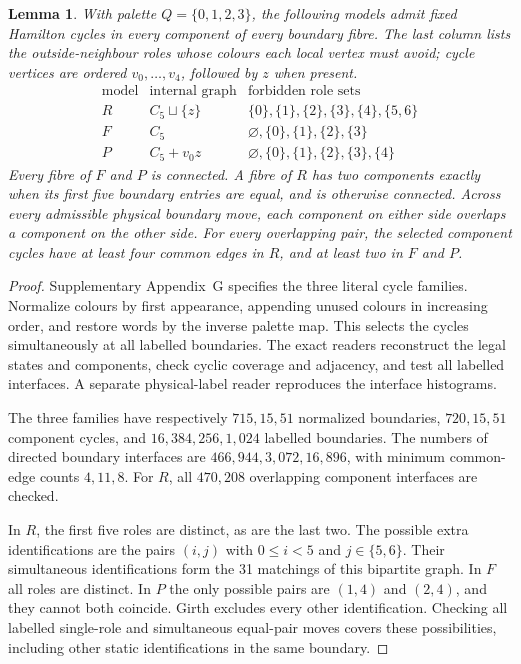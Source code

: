 \documentclass[11pt]{article}
\newtheorem{lemma}[theorem]{Lemma}
\theoremstyle{remark}
\numberwithin{equation}{section}
\numberwithin{table}{section}
\begin{document}
\begin{lemma}\label{lem:pentagonal-reservoir-data}
With palette $Q=\{0,1,2,3\}$, the following models admit fixed Hamilton
cycles in every component of every boundary fibre. The last column lists
the outside-neighbour roles whose colours each local vertex must avoid;
cycle vertices are ordered $v_0,\ldots,v_4$, followed by $z$ when present.
\[
\begin{array}{c|c|l}
\text{model}&\text{internal graph}&\text{forbidden role sets}\\ \hline
R&C_5\sqcup\{z\}&\{0\},\{1\},\{2\},\{3\},\{4\},\{5,6\}\\
F&C_5&\varnothing,\{0\},\{1\},\{2\},\{3\}\\
P&C_5+v_0z&\varnothing,\{0\},\{1\},\{2\},\{3\},\{4\}
\end{array}
\]
Every fibre of $F$ and $P$ is connected. A fibre of $R$ has two components
exactly when its first five boundary entries are equal, and is otherwise
connected. Across every admissible physical boundary move, each component
on either side overlaps a component on the other side. For every overlapping
pair, the selected component cycles have at least four common edges in
$R$, and at least two in $F$ and $P$.
\end{lemma}
\begin{proof}
Supplementary Appendix~G specifies the three literal cycle families.
Normalize colours by first appearance, appending unused colours in
increasing order, and restore words by the inverse palette map. This selects
the cycles simultaneously at all labelled boundaries. The exact readers
reconstruct the legal states and components, check cyclic coverage and
adjacency, and test all labelled interfaces. A separate physical-label
reader reproduces the interface histograms.

The three families have respectively $715,15,51$ normalized boundaries,
$720,15,51$ component cycles, and $16{,}384,256,1{,}024$ labelled boundaries.
The numbers of directed boundary interfaces are
$466{,}944,3{,}072,16{,}896$, with minimum common-edge counts $4,11,8$.
For $R$, all $470{,}208$ overlapping component interfaces are checked.

In $R$, the first five roles are distinct, as are the last two. The possible
extra identifications are the pairs $(i,j)$ with $0\le i<5$ and
$j\in\{5,6\}$. Their simultaneous identifications form the 31 matchings
of this bipartite graph. In $F$ all roles are distinct. In $P$ the only
possible pairs are $(1,4)$ and $(2,4)$, and they cannot both coincide.
Girth excludes every other identification. Checking all labelled single-role
and simultaneous equal-pair moves covers these possibilities, including
other static identifications in the same boundary.
\end{proof}
\end{document}
